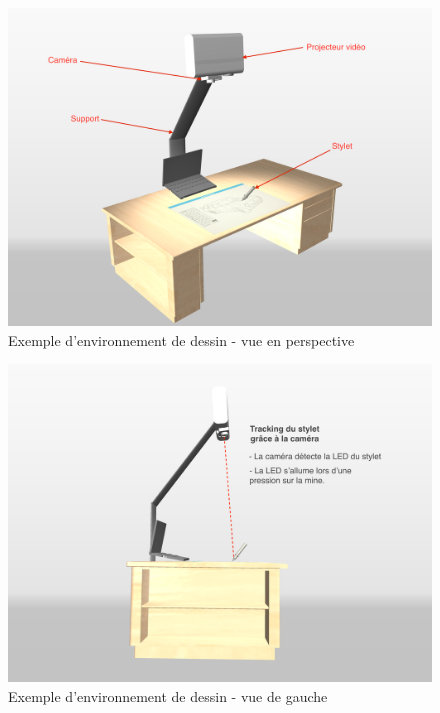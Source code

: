 \documentclass[11pt,a4paper,oldfontcommands]{memoir}
\begin{document}
\begin{figure}[h]
\centering
\includegraphics[angle=90, scale=0.15]{images/drawing-environment.png}
\caption{Exemple d'environnement de dessin - vue en perspective}
\end{figure}

\newpage

\begin{figure}[h]
\centering
\includegraphics[angle=90, scale=0.15]{images/drawing-environment-side.png}
\caption{Exemple d'environnement de dessin - vue de gauche}
\end{figure}

\end{document}
